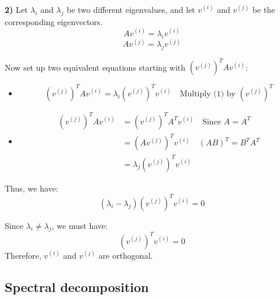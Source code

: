 \begin{derivation}    
    \textbf{2)} Let $\lambda_i$ and $\lambda_j$ be two different eigenvalues, and let $v^{(i)}$ and $v^{(j)}$ be the corresponding eigenvectors. 
    \[
    A v^{(i)} = \lambda_i v^{(i)} \tag{1}
    \]
    \[
    A v^{(j)} = \lambda_j v^{(j)} \tag{2}
    \]
    
    Now set up two equivalent equations starting with $(v^{(j)})^T A v^{(i)}$:
    \begin{itemize}
        \item 
        \[
    (v^{(j)})^T A v^{(i)} = \lambda_i (v^{(j)})^T v^{(i)} \quad \text{Multiply (1) by $(v^{(j)})^T$}
    \]
        \item 
        \begin{align*}
            (v^{(j)})^T A v^{(i)} &= (v^{(j)})^T A^T v^{(i)} \quad \text{Since $A = A^T$} \\ 
            &= (Av^{(j)})^T v^{(i)} \quad \text{$(AB)^T = B^T A^T$} \\
            &= \lambda_j (v^{(j)})^T v^{(i)} 
        \end{align*}
    \end{itemize}
    \vspace{1em}
    
    Thus, we have:
    \[
    (\lambda_i - \lambda_j) (v^{(j)})^T v^{(i)} = 0
    \]
    
    Since $\lambda_i \neq \lambda_j$, we must have:
    \[
    (v^{(j)})^T v^{(i)} = 0
    \]
    Therefore, $v^{(i)}$ and $v^{(j)}$ are orthogonal.
\end{derivation}

\subsection{Spectral decomposition}
